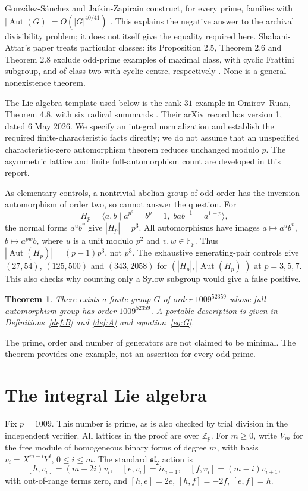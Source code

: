 \documentclass[11pt]{article}
\newtheorem{theorem}{Theorem}[section]
\theoremstyle{definition}\newtheorem{definition}[theorem]{Definition}
\theoremstyle{remark}\newtheorem{remark}[theorem]{Remark}
\DeclareMathOperator{\Aut}{Aut}
\newcommand{\Zp}{\mathbb Z_p}
\newcommand{\Fp}{\mathbb F_p}
\begin{document}
Gonz\'alez-S\'anchez and Jaikin-Zapirain construct, for every prime, families with
$|\Aut(G)|=O(|G|^{40/41})$ \cite{GSJ}. This explains the negative answer to the
archival divisibility problem; it does not itself give the equality required
here. Shabani-Attar's paper treats particular classes: its Proposition 2.5,
Theorem 2.6 and Theorem 2.8 exclude odd-prime examples of maximal class, with
cyclic Frattini subgroup, and of class two with cyclic centre, respectively
\cite{SA}. None is a general nonexistence theorem.

The Lie-algebra template used below is the rank-$31$ example in
Omirov--Ruan, Theorem 4.8, with six radical summands \cite{OR}. Their arXiv
record has version 1, dated 6 May 2026. We specify an integral normalization
and establish the required finite-characteristic facts directly; we do not
assume that an unspecified characteristic-zero automorphism theorem reduces
unchanged modulo $p$. The asymmetric lattice and finite full-automorphism
count are developed in this report.

As elementary controls, a nontrivial abelian group of odd order has the
inversion automorphism of order two, so cannot answer the question. For
\[
 H_p=\langle a,b\mid a^{p^2}=b^p=1,\;bab^{-1}=a^{1+p}\rangle,
\]
the normal forms $a^u b^v$ give $|H_p|=p^3$. All automorphisms have images
$a\mapsto a^u b^v$, $b\mapsto a^{pw}b$, where $u$ is a unit modulo $p^2$
and $v,w\in\Fp$. Thus $|\Aut(H_p)|=(p-1)p^3$, not $p^3$.
The exhaustive generating-pair controls give $(27,54)$, $(125,500)$ and
$(343,2058)$ for $(|H_p|,|\Aut(H_p)|)$ at $p=3,5,7$.
This also checks why counting only a Sylow subgroup would give a false positive.

\begin{theorem}\label{thm:main}
There exists a finite group $G$ of order $1009^{52359}$ whose full automorphism
group has order $1009^{52359}$. A portable description is given in
Definitions~\ref{def:B} and \ref{def:A} and equation~\eqref{eq:G}.
\end{theorem}
The prime, order and number of generators are not claimed to be minimal.
The theorem provides one example, not an assertion for every odd prime.

\section{The integral Lie algebra}
Fix $p=1009$. This number is prime, as is also checked by trial division in
the independent verifier. All lattices in the proof are over $\Zp$.
For $m\ge0$, write $V_m$ for the free module of homogeneous binary forms of
degree $m$, with basis $v_i=X^{m-i}Y^i$, $0\le i\le m$.
The standard $\mathfrak{sl}_2$ action is
\begin{equation}\label{eq:action}
 [h,v_i]=(m-2i)v_i,\quad [e,v_i]=i v_{i-1},\quad
 [f,v_i]=(m-i)v_{i+1},
\end{equation}
with out-of-range terms zero, and
$[h,e]=2e$, $[h,f]=-2f$, $[e,f]=h$.
\end{document}
